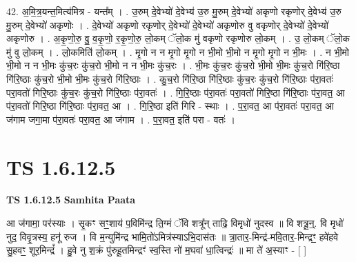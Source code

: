 \documentclass[17pt]{extarticle}
\begin{document}
42. अ॒मि॒त्र॒यन्त॒मित्य॑मित्र - यन्त᳚म् । . उ॒रुम् दे॒वेभ्यो॑ दे॒वेभ्य॑ उ॒रु मु॒रुम् दे॒वेभ्यो॑ अकृणो रकृणोर् दे॒वेभ्य॑ उ॒रु मु॒रुम् दे॒वेभ्यो॑ अकृणोः । . दे॒वेभ्यो॑ अकृणो रकृणोर् दे॒वेभ्यो॑ दे॒वेभ्यो॑ अकृणोरु वु वकृणोर् दे॒वेभ्यो॑ दे॒वेभ्यो॑ अकृणोरु । . अ॒कृ॒णो॒रु॒ वु॒ व॒कृ॒णो॒ र॒कृ॒णो॒रु॒ लो॒कम् ॅलो॒क मु॑ वकृणो रकृणोरु लो॒कम् । . उ॒ लो॒कम् ॅलो॒क मु॑ वु लो॒कम् । . लो॒कमिति॑ लो॒कम् । . मृ॒गो न न मृ॒गो मृ॒गो न भी॒मो भी॒मो न मृ॒गो मृ॒गो न भी॒मः । . न भी॒मो भी॒मो न न भी॒मः कु॑च॒रः कु॑च॒रो भी॒मो न न भी॒मः कु॑च॒रः । . भी॒मः कु॑च॒रः कु॑च॒रो भी॒मो भी॒मः कु॑च॒रो गि॑रि॒ष्ठा गि॑रि॒ष्ठाः कु॑च॒रो भी॒मो भी॒मः कु॑च॒रो गि॑रि॒ष्ठाः । . कु॒च॒रो गि॑रि॒ष्ठा गि॑रि॒ष्ठाः कु॑च॒रः कु॑च॒रो गि॑रि॒ष्ठाः प॑रा॒वतः॑ परा॒वतो॑ गिरि॒ष्ठाः कु॑च॒रः कु॑च॒रो गि॑रि॒ष्ठाः प॑रा॒वतः॑ । . गि॒रि॒ष्ठाः प॑रा॒वतः॑ परा॒वतो॑ गिरि॒ष्ठा गि॑रि॒ष्ठाः प॑रा॒वत॒ आ प॑रा॒वतो॑ गिरि॒ष्ठा गि॑रि॒ष्ठाः प॑रा॒वत॒ आ । . गि॒रि॒ष्ठा इति॑ गिरि - स्थाः । . प॒रा॒वत॒ आ प॑रा॒वतः॑ परा॒वत॒ आ ज॑गाम जगा॒मा प॑रा॒वतः॑ परा॒वत॒ आ ज॑गाम । . प॒रा॒वत॒ इति॑ परा - वतः॑ । \newline
\pagebreak
{}

\section{ TS 1.6.12.5 }

\textbf{TS 1.6.12.5 } \newline
\textbf{Samhita Paata} \newline

आ ज॑गामा॒ पर॑स्याः । सृ॒कꣳ सꣳ॒॒शाय॑ प॒विमि॑न्द्र ति॒ग्मं ॅवि शत्रू᳚न् ताढि॒ विमृधो॑ नुदस्व ॥ वि शत्रू॒न्॒. वि मृधो॑ नुद॒ विवृ॒त्रस्य॒ हनू॑ रुज । वि म॒न्युमि॑न्द्र भामि॒तो॑ऽमित्र॑स्याऽभि॒दास॑तः ॥ त्रा॒तार॒-मिन्द्र॑-मवि॒तार॒-मिन्द्रꣳ॒॒ हवे॑हवे सु॒हवꣳ॒॒ शूर॒मिन्द्रं᳚ । हु॒वे नु श॒क्रं पु॑रुहू॒तमिन्द्रꣳ॑ स्व॒स्ति नो॑ म॒घवा॑ धा॒त्विन्द्रः॑ ॥ मा ते॑ अ॒स्याꣳ - [ ] \newline
\end{document}
